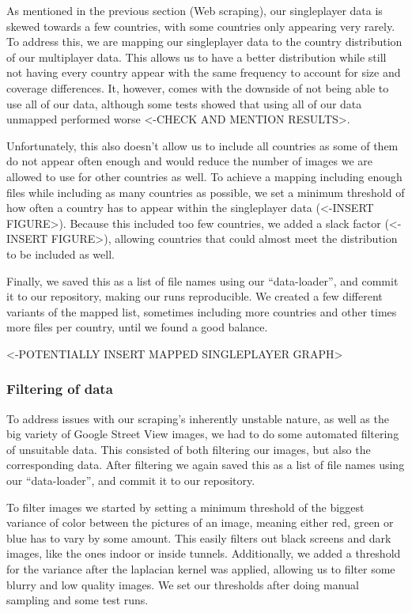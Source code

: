 \documentclass{article}
\begin{document}
As mentioned in the previous section (Web scraping), our singleplayer
data is skewed towards a few countries, with some countries only
appearing very rarely. To address this, we are mapping our singleplayer
data to the country distribution of our multiplayer data. This allows us
to have a better distribution while still not having every country
appear with the same frequency to account for size and coverage
differences. It, however, comes with the downside of not being able to
use all of our data, although some tests showed that using all of our
data unmapped performed worse \textless-CHECK AND MENTION
RESULTS\textgreater.

Unfortunately, this also doesn't allow us to include all countries as
some of them do not appear often enough and would reduce the number of
images we are allowed to use for other countries as well. To achieve a
mapping including enough files while including as many countries as
possible, we set a minimum threshold of how often a country has to
appear within the singleplayer data (\textless-INSERT
FIGURE\textgreater). Because this included too few countries, we added a
slack factor (\textless-INSERT FIGURE\textgreater), allowing countries
that could almost meet the distribution to be included as well.

Finally, we saved this as a list of file names using our
``data-loader'', and commit it to our repository, making our runs
reproducible. We created a few different variants of the mapped list,
sometimes including more countries and other times more files per
country, until we found a good balance.

\textless-POTENTIALLY INSERT MAPPED SINGLEPLAYER GRAPH\textgreater{}

\subsubsection{Filtering of data}\label{filtering-of-data}

To address issues with our scraping's inherently unstable nature, as
well as the big variety of Google Street View images, we had to do some
automated filtering of unsuitable data. This consisted of both filtering
our images, but also the corresponding data. After filtering we again
saved this as a list of file names using our ``data-loader'', and commit
it to our repository.

To filter images we started by setting a minimum threshold of the
biggest variance of color between the pictures of an image, meaning
either red, green or blue has to vary by some amount. This easily
filters out black screens and dark images, like the ones indoor or
inside tunnels. Additionally, we added a threshold for the variance
after the laplacian kernel was applied, allowing us to filter some
blurry and low quality images. We set our thresholds after doing manual
sampling and some test runs.
\end{document}
